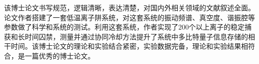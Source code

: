 
\begin{comments}

    该博士论文书写规范，逻辑清晰，表达清楚，对国内外相关领域的文献叙述全面。论文作者搭建了一套低温离子阱系统，对这套系统的振动频谱、真空度、谐振腔等参数做了科学和系统的测试。利用这套系统，作者实现了200个以上离子的稳定捕获和长时间囚禁，测量并通过协同冷却方法提升了系统中多比特量子信息存储的相干时间。该博士论文的理论和实验结合紧密，实验数据完备，理论和实验结果相符合，是一篇优秀的博士论文。
    

\end{comments}
